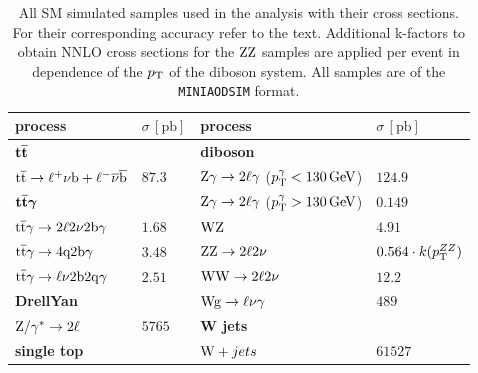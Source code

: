 \begin{table}[tbp]
 \centering
 \caption{All SM simulated samples used in the analysis with their cross sections. For their corresponding accuracy refer to the text. Additional k-factors to obtain NNLO cross sections for the $\mathrm{Z}\mathrm{Z}$ samples are applied per event in dependence of the $p_{\mathrm{T}}$ of the diboson system. All samples are of the \texttt{MINIAODSIM} format.}
 \label{tab:MCsamples}
 \begin{tabular}[width=\textwidth]{ll|ll}
  \hline
  \normalsize{process}                             & \normalsize{$\sigma\,[\mathrm{pb}]$} & \normalsize{process}                         & \normalsize{$\sigma\,[\mathrm{pb}]$} \\\hline
  $\boldsymbol{{\mathrm{t}\overline{\mathrm{t}}}}$                            &                                      & \textbf{diboson}                             &                                      \\
  ${\mathrm{t}\overline{\mathrm{t}}}\to\ell^{+}\nu\mathrm{b}+\ell^{-}\overline{\nu}\overline{\mathrm{b}}$ & $87.3$                               & $\mathrm{Z}\gamma\to2\ell\gamma$ ($p_{\mathrm{T}}^{\gamma}<130\,\text{Ge\hspace{-.08em}V}$) & $124.9$                              \\
  $\boldsymbol{{\mathrm{t}\overline{\mathrm{t}}}\gamma}$                        &                                      & $\mathrm{Z}\gamma\to2\ell\gamma$ ($p_{\mathrm{T}}^{\gamma}>130\,\text{Ge\hspace{-.08em}V}$) & $0.149$                              \\
  ${\mathrm{t}\overline{\mathrm{t}}}\gamma\to2\ell2\nu2\mathrm{b}\gamma$              & $1.68$                               & $\mathrm{W}\mathrm{Z}$                                     & $4.91$                               \\
  ${\mathrm{t}\overline{\mathrm{t}}}\gamma\to4\mathrm{q}2\mathrm{b}\gamma$                   & $3.48$                               & $\mathrm{Z}\mathrm{Z}\to2\ell2\nu$                        & $0.564\cdot k(p_{\mathrm{T}}^{ZZ})$             \\
  ${\mathrm{t}\overline{\mathrm{t}}}\gamma\to\ell\nu2\mathrm{b}2\mathrm{q}\gamma$           & $2.51$                               & $\mathrm{W}\mathrm{W}\to2\ell2\nu$                        & $12.2$                               \\
  \textbf{DrellYan}                                &                                      & $\mathrm{W}\mathrm{g}\to\ell\nu\gamma$                      & $489$                                \\
  $\mathrm{Z}/\gamma^{*}\to2\ell$                           & $5765$                               & \textbf{W jets}                              &                                      \\
  \textbf{single top}                              &                                      & $\mathrm{W}+jets$                                   & $61527$                              \\

\end{tabular}
\end{table}
